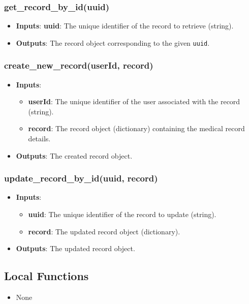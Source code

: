 \documentclass[12pt, titlepage]{article}
\begin{document}
\subsubsection{get\_record\_by\_id(uuid)}
\begin{itemize}
    \item \textbf{Inputs}: \textbf{uuid}: The unique identifier of the record to retrieve (string).
    \item \textbf{Outputs}: The record object corresponding to the given \texttt{uuid}.
\end{itemize}

\subsubsection{create\_new\_record(userId, record)}
\begin{itemize}
    \item \textbf{Inputs}:
        \begin{itemize}
            \item \textbf{userId}: The unique identifier of the user associated with the record (string).
            \item \textbf{record}: The record object (dictionary) containing the medical record details.
        \end{itemize}
    \item \textbf{Outputs}: The created record object.
\end{itemize}

\subsubsection{update\_record\_by\_id(uuid, record)}
\begin{itemize}
    \item \textbf{Inputs}:
        \begin{itemize}
            \item \textbf{uuid}: The unique identifier of the record to update (string).
            \item \textbf{record}: The updated record object (dictionary).
        \end{itemize}
    \item \textbf{Outputs}: The updated record object.
\end{itemize}


\subsection{Local Functions}
\begin{itemize}
\item None
\end{itemize}
\end{document}
